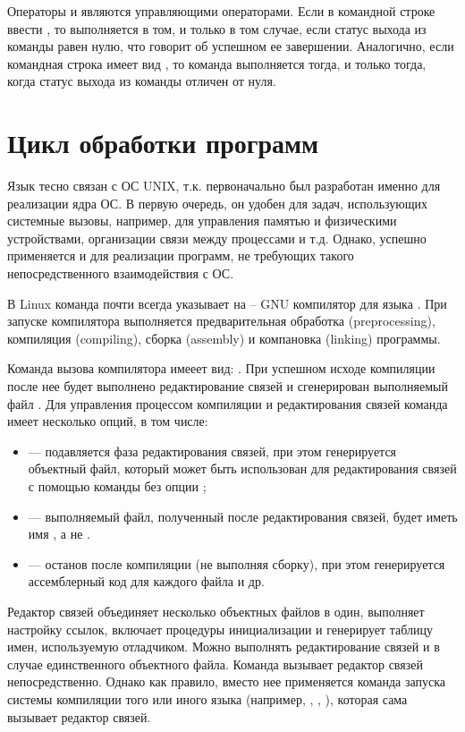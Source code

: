 Операторы \code{||} и \code{\&\&} являются управляющими операторами. Если в командной строке ввести , то  выполняется в том, и только в том случае, если статус выхода из команды  равен нулю, что говорит об успешном ее завершении. Аналогично, если командная строка имеет вид , то команда  выполняется тогда, и только тогда, когда статус выхода из команды  отличен от нуля.

\section{Цикл обработки программ}

Язык  тесно связан с ОС UNIX, т.к. первоначально был разработан именно для реализации ядра ОС. В первую очередь, он удобен для задач, использующих системные вызовы, например, для управления памятью и физическими устройствами, организации связи между процессами и т.д. Однако,  успешно применяется и для реализации программ, не требующих такого непосредственного взаимодействия с ОС.

В Linux команда  почти всегда указывает на  -- GNU компилятор для языка . При запуске компилятора выполняется предварительная обработка (preprocessing), компиляция (compiling), сборка (assembly) и компановка (linking) программы. 

Команда вызова компилятора имееет вид: . При успешном исходе компиляции после нее будет выполнено редактирование связей и сгенерирован выполняемый файл . Для управления процессом компиляции и редактирования связей команда  имеет несколько опций, в том числе: 
\begin{itemize}
	\item {} --- подавляется фаза редактирования связей, при этом генерируется объектный файл, который может быть использован для редактирования связей с помощью команды  без опции ;
	\item {} --- выполняемый файл, полученный после редактирования связей, будет иметь имя , а не . 
	\item {} --- останов после компиляции (не выполняя сборку), при этом генерируется ассемблерный код для каждого файла и др.
\end{itemize}

Редактор связей объединяет несколько объектных файлов в один, выполняет настройку ссылок, включает процедуры инициализации и генерирует таблицу имен, используемую отладчиком. Можно выполнять редактирование связей и в случае единственного объектного файла. Команда  вызывает редактор связей непосредственно. Однако как правило, вместо нее применяется команда запуска системы компиляции того или иного языка (например, , , ), которая сама вызывает редактор связей.

